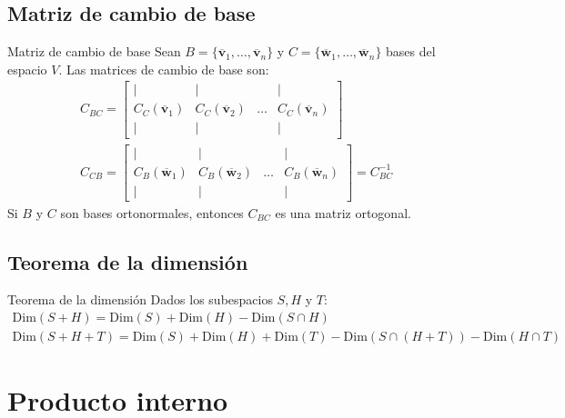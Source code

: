 \documentclass[a4paper, twoside]{article}
\numberwithin{equation}{section}
\numberwithin{figure}{section}
\numberwithin{table}{section}
\newcommand{\vect}[1]{\overline{\textbf{#1}}}
\newcommand{\dime}[1]{\text{Dim}(#1)}
\begin{document}
\subsection{Matriz de cambio de base}
\begin{definicion*}{Matriz de cambio de base}
	Sean $B=\{\vect{v}_1,\ldots,\vect{v}_n \}$ y $C=\{\vect{w}_1,\ldots,\vect{w}_n \}$ bases del espacio $V$. Las matrices de cambio de base son:
	\begin{align}
		C_{BC}=\begin{bmatrix}{|}&{|}&{ }&{|}\\{C_C(\vect{v}_1)}&{C_C(\vect{v}_2)}&{\ldots}&{C_C(\vect{v}_n)}\\{|}&{|}&{ }&{|}\end{bmatrix} \\
		C_{CB}=\begin{bmatrix}{|}&{|}&{ }&{|}\\{C_B(\vect{w}_1)}&{C_B(\vect{w}_2)}&{\ldots}&{C_B(\vect{w}_n)}\\{|}&{|}&{ }&{|}\end{bmatrix}=C_{BC}^{-1}
	\end{align}
	Si $B$ y $C$ son bases ortonormales, entonces $C_{BC}$ es una matriz ortogonal.
\end{definicion*}

\subsection{Teorema de la dimensión}
\begin{teorema*}{Teorema de la dimensión}
	Dados los subespacios $S,H$ y $T$:
	\begin{align}
		\dime{S+H}=\dime{S}+\dime{H}-\dime{S \cap H} \\
		\dime{S+H+T}=\dime{S}+\dime{H}+\dime{T}-\dime{S \cap (H+T)}-\dime{H \cap T}
	\end{align}
\end{teorema*}

\newpage
\section{Producto interno}
\end{document}
